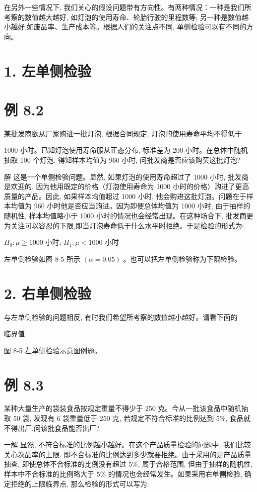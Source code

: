 \documentclass[10pt]{article}
\begin{document}
\begin{CJK*}{UTF8}{bsmi}
在另外一些情况下, 我们关心的假设问题带有方向性。有两种情况：一种是我们所考察的数值越大越好, 如灯泡的使用寿命、轮胎行驶的里程数等; 另一种是数值越小越好,如废品率、生产成本等。根据人们的关注点不同, 单侧检验可以有不同的方向。

\section*{1. 左单侧检验}
\section*{例 8.2}
某批发商欲从厂家购进一批灯泡, 根据合同规定, 灯泡的使用寿命平均不得低于

1000 小时。已知灯泡使用寿命服从正态分布, 标准差为 200 小时。在总体中随机抽取 100 个灯泡, 得知样本均值为 960 小时, 问批发商是否应该购买这批灯泡?

解 这是一个单侧检验问题。显然, 如果灯泡的使用寿命超过了 1000 小时, 批发商是欢迎的, 因为他用既定的价格（灯泡使用寿命为 1000 小时的价格）购进了更高质量的产品。因此, 如果样本均值超过 1000 小时, 他会购进这批灯泡。问题在于样本均值为 960 小时他是否应当购进。因为即便总体均值为 1000 小时, 由于抽样的随机性, 样本均值略小于 1000 小时的情况也会经常出现。在这种场合下, 批发商更为关注可以容忍的下限,即当灯泡寿命低于什么水平时拒绝。于是检验的形式为:

$H_{0}: \mu \geqslant 1000$ 小时; $H_{1}: \mu<1000$ 小时

左单侧检验如图 8-5 所示 $(\alpha=0.05)$ 。也可以把左单侧检验称为下限检验。

\section*{2. 右单侧检验}
与左单侧检验的问题相反, 有时我们希望所考察的数值越小越好。请看下面的

\begin{center}
\end{center}

临界值

图 8-5 左单侧检验示意图例题。

\section*{例 8.3}
某种大量生产的袋装食品按规定重量不得少于 250 克。今从一批该食品中随机抽取 50 袋, 发现有 6 袋重量低于 250 克, 若规定不符合标准的比例达到 $5 \%$, 食品就不得出厂,问该批食品能否出厂?

一解 显然, 不符合标准的比例越小越好。在这个产品质量检验的问题中, 我们比较关心次品率的上限, 即不合标准的比例达到多少就要拒绝。由于采用的是产品质量抽查, 即使总体不合标准的比例没有超过 $5 \%$, 属于合格范围, 但由于抽样的随机性, 样本中不合标准的比例略大于 $5 \%$ 的情况也会经常发生。如果采用右单侧检验, 确定拒绝的上限临界点, 那么检验的形式可以写为:


\end{CJK*}
\end{document}
